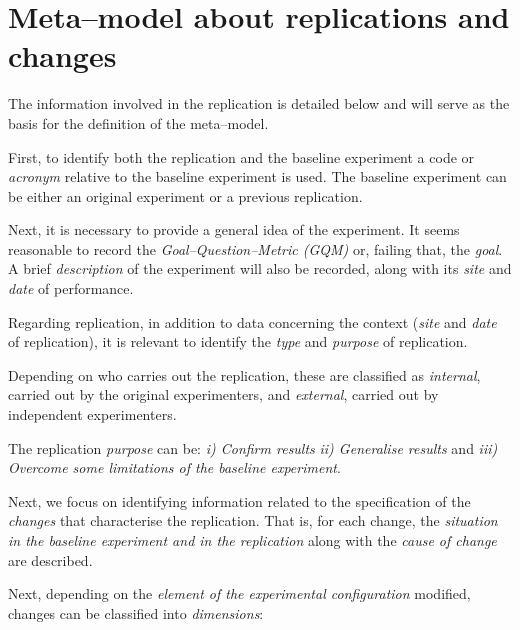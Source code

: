  
\section{Meta--model about replications and changes}
\label{sec:metamodelo} 

The information involved in the replication is detailed below and will serve as the basis for the definition of the meta--model.

First, to identify both the replication and the baseline experiment a code or \emph{acronym} relative to the baseline experiment is used. The baseline experiment can be either an original experiment or a previous replication.

Next, it is necessary to provide a general idea of the experiment. It seems reasonable to record the \emph{Goal--Question--Metric (GQM)} \cite{Basili1994} or, failing that, the \emph{goal}. 
A brief \emph{description} of the experiment will also be recorded, along with its \textit{site} and \textit{date} of performance.

Regarding replication, in addition to data concerning the context (\textit{site} and \textit{date} of replication), it is relevant to identify the \textit{type} and \textit{purpose} of replication.

Depending on who carries out the replication, these are classified as \textit{internal}, carried out by the original experimenters, and \textit{external}, carried out by independent experimenters.

The replication \textit{purpose} can be: \emph{i) Confirm results} \emph{ii) Generalise results} and \emph{iii) Overcome some limitations of the baseline experiment}.

Next, we focus on identifying information related to the specification of the \textit{changes} that characterise the replication.
That is, for each change, the \emph{situation in the baseline experiment and in the replication} along with the \emph{cause of change} are described.

Next, depending on the \emph{element of the experimental configuration} modified, changes can be classified into \emph{dimensions}: 


